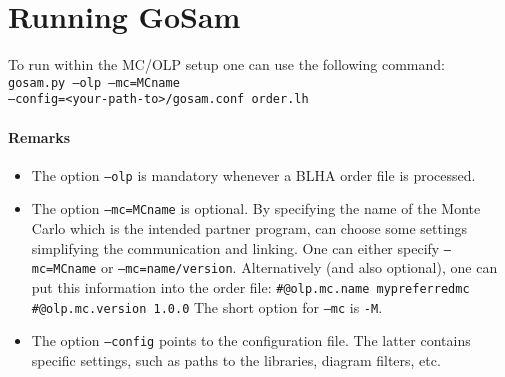 \clearpage

\section{Running GoSam}
To run \gosam{} within the MC/OLP setup one can use the following command:\\
{\tt gosam.py --olp --mc=MCname }\\
{\tt    --config=<your-path-to>/gosam.conf order.lh}

\paragraph{Remarks}
\begin{itemize}
\item The option \texttt{--olp} is mandatory whenever 
   a BLHA order file is processed.
\item The option \texttt{--mc=MCname} is optional. By specifying the
   name of the Monte Carlo which is the intended partner program,
   \gosam{} can choose some settings simplifying the communication and linking.
   One can either specify \texttt{--mc=MCname} or \texttt{--mc=name/version}.
   Alternatively (and also optional),
   one can put this information into the order file:
{\tt \#@olp.mc.name mypreferredmc}\\
{\tt \#@olp.mc.version 1.0.0}
   The short option for \texttt{--mc} is \texttt{-M}.
\item The option \texttt{--config} points to the configuration file.
   The latter contains \gosam{} specific settings, such as paths to the 
   libraries, diagram filters, etc.
   
   

\end{itemize}
